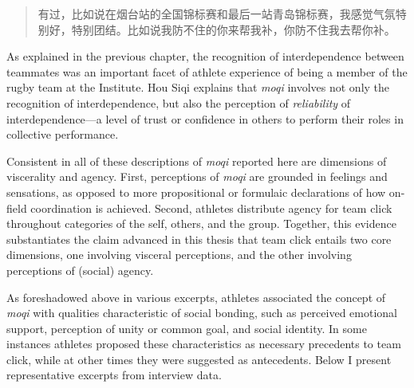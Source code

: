 \begin{CJK}{UTF8}{gbsn}
  \begin{quote}
    有过，比如说在烟台站的全国锦标赛和最后一站青岛锦标赛，我感觉气氛特别好，特别团结。比如说我防不住的你来帮我补，你防不住我去帮你补。
  \end{quote}

As explained in the previous chapter, the recognition of interdependence between teammates was an important facet of athlete experience of being a member of the rugby team at the Institute.  Hou Siqi explains that \textit{moqi} involves not only the recognition of interdependence, but also the perception of \textit{reliability} of interdependence---a level of trust or confidence in others to perform their roles in collective performance.


Consistent in all of these descriptions of \textit{moqi} reported here are dimensions of viscerality and agency.  First, perceptions of \textit{moqi} are grounded in feelings and sensations, as opposed to more propositional or formulaic declarations of how on-field coordination is achieved.  Second, athletes distribute agency for team click throughout categories of the self, others, and the group.  Together, this evidence substantiates the claim advanced in this thesis that team click entails two core dimensions, one involving visceral perceptions, and the other involving perceptions of (social) agency.





As foreshadowed above in various excerpts, athletes associated the concept of \textit{moqi} with qualities characteristic of social bonding, such as perceived emotional support, perception of unity or common goal, and social identity.  In some instances athletes proposed these characteristics as necessary precedents to team click, while at other times they were suggested as antecedents.  Below I present representative excerpts from interview data.


\end{CJK}
